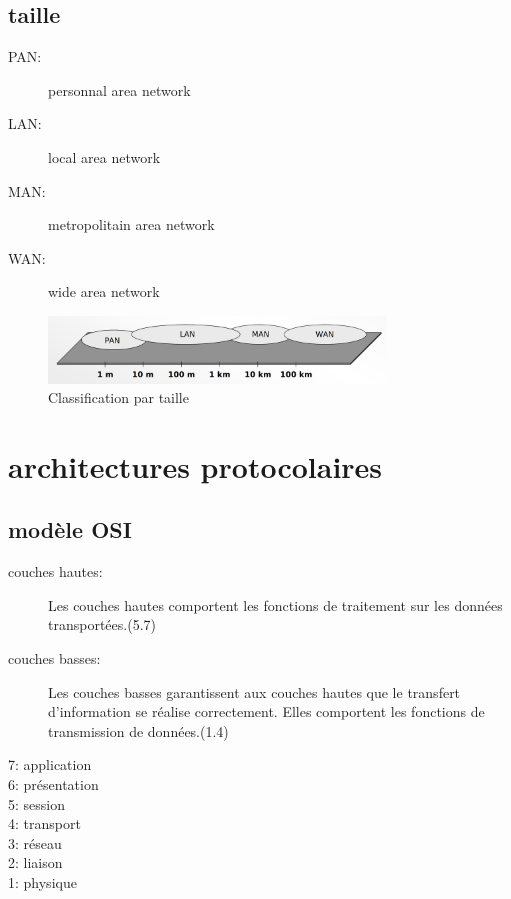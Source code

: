 \documentclass[a4paper, 9pt]{article}
\begin{document}
        \subsection{taille}
            \begin{description}
                \item[PAN:] personnal area network
                \item[LAN:] local area network
                \item[MAN:] metropolitain area network
                \item[WAN:] wide area network
            \end{description}
            \begin{figure}[ht]
                \centering
                \includegraphics[width=0.8\textwidth]{classification_taille.png}
                \caption{Classification par taille}
                \label{fig:classification_taille}
            \end{figure}
    \section{architectures protocolaires}
        \subsection{modèle OSI}
            \begin{description}
                \item[couches hautes:]Les couches hautes comportent les fonctions de
                traitement sur les données transportées.(5.7)
                \item[couches basses:]Les couches basses garantissent aux couches hautes
                que le transfert d’information se réalise correctement.
                Elles comportent les fonctions de transmission de
                données.(1.4)
            \end{description}
            7: application\\
            6: présentation\\
            5: session\\
            4: transport\\
            3: réseau\\
            2: liaison\\
            1: physique\\
\end{document}
